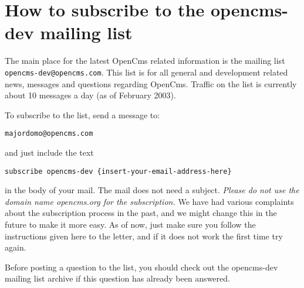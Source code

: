 \section{How to subscribe to the opencms-dev mailing list}
The main place for the latest OpenCms related information is the mailing list\\ {\tt opencms-dev@opencms.com}. 
This list is for all general and development related news, messages and questions regarding OpenCms.
Traffic on the list is currently about 10 messages a day (as of February 2003).

To subscribe to the list, send a message to:

{\tt majordomo@opencms.com}

and just include the text

{\tt subscribe opencms-dev \{insert-your-email-address-here\}}

in the body of your mail. The mail does not need a subject. 
{\em Please do not use the domain name opencms.org for the subscription.} We have had various complaints about the 
subscription process in the past, and we might change this in the future to make it more easy. As of now, just 
make sure you follow the instructions given here to the letter, and if it does not work the first time try again.

Before posting a question to the list, you should check out the opencms-dev mailing list archive if this question 
has already been answered.
